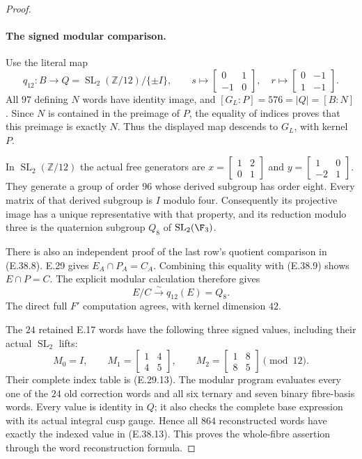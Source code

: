 \begin{proof}
\paragraph{The signed modular comparison.}
Use the literal map
\[
 q_{12}:B\longrightarrow Q=
       \operatorname{SL}_2(\mathbb Z/12)/\{\pm I\},
 \qquad
 s\longmapsto\begin{bmatrix}0&1\\-1&0\end{bmatrix},
 \quad r\longmapsto\begin{bmatrix}0&-1\\1&-1\end{bmatrix}.
 \tag{E.38.11}
\]
All $97$ defining $N$ words have identity image,
and $[G_L:P]=576=|Q|=[B:N]$.
Since $N$ is contained in the preimage of $P$,
the equality of indices proves that this
preimage is exactly $N$.  Thus the displayed
map descends to $G_L$, with kernel $P$.

In $\operatorname{SL}_2(\mathbb Z/12)$ the actual
free generators are
$x=\left[\begin{smallmatrix}1&2\\0&1\end{smallmatrix}\right]$
and
$y=\left[\begin{smallmatrix}1&0\\-2&1\end{smallmatrix}\right]$.
They generate a group of order $96$ whose
derived subgroup has order eight.  Every
matrix of that derived subgroup is $I$
modulo four.  Consequently its projective
image has a unique representative with that
property, and its reduction modulo three
is the quaternion subgroup $Q_8$ of
$\operatorname{SL}_2(\F_3)$.

There is also an independent proof of the
last row's quotient comparison in
\textup{(E.38.8)}.  E.29 gives
$E_A\cap P_A=C_A$.  Combining this equality
with \textup{(E.38.9)} shows $E\cap P=C$.
The explicit modular calculation therefore gives
\[
                 E/C\xrightarrow{\sim}q_{12}(E)=Q_8.
 \tag{E.38.12}
\]
The direct full $F'$ computation agrees, with
kernel dimension $42$.

The $24$ retained E.17 words have the following
three signed values, including their actual
$\operatorname{SL}_2$ lifts:
\[
 M_0=I,\qquad
 M_1=\begin{bmatrix}1&4\\4&5\end{bmatrix},\qquad
 M_2=\begin{bmatrix}1&8\\8&5\end{bmatrix}
                      \pmod{12}.
 \tag{E.38.13}
\]
Their complete index table is (E.29.13).
The modular program evaluates every one of
the $24$ old correction words and all six
ternary and seven binary fibre-basis words.
Every value is identity in $Q$; it also
checks the complete base expression with
its actual integral cusp gauge.  Hence
all $864$ reconstructed words have exactly
the indexed value in \textup{(E.38.13)}.
This proves the whole-fibre assertion
through the word reconstruction formula.


\end{proof}

